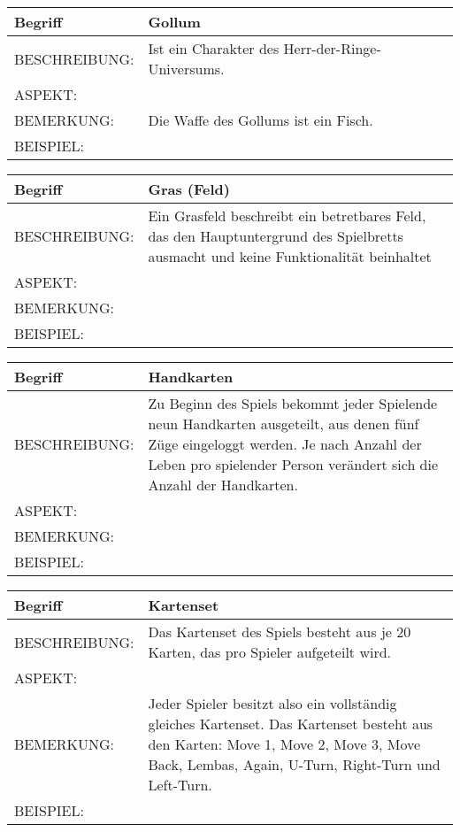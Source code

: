 \documentclass{uulm-assignment}
\begin{document}
	     \begin{tabularx}{\textwidth}{|l|X |} \hline
	        \textbf{Begriff} & \textbf{Gollum } \\
	        \hline
	        BESCHREIBUNG: & Ist ein Charakter des Herr-der-Ringe-Universums. \\
	        \hline
	        ASPEKT: &
	        \\
	        \hline
	        BEMERKUNG: & Die Waffe des Gollums ist ein Fisch.\\
	        \hline
	        BEISPIEL: & \\
	        \hline
	    \end{tabularx}

	     \begin{tabularx}{\textwidth}{|l|X |} \hline
	        \textbf{Begriff} & \textbf{Gras (Feld)} \\
	        \hline
	        BESCHREIBUNG: & Ein Grasfeld beschreibt ein betretbares Feld, das den Hauptuntergrund des Spielbretts ausmacht und keine Funktionalität beinhaltet \\
	        \hline
	        ASPEKT: &
	        \\
	        \hline
	        BEMERKUNG: & \\
	        \hline
	        BEISPIEL: & \\
	        \hline
	    \end{tabularx}

	     \begin{tabularx}{\textwidth}{|l|X |} \hline
	        \textbf{Begriff} & \textbf{Handkarten} \\
	        \hline
	        BESCHREIBUNG: & Zu Beginn des Spiels bekommt jeder Spielende neun Handkarten ausgeteilt, aus denen fünf Züge eingeloggt werden. Je nach Anzahl der Leben pro spielender Person verändert sich die Anzahl der Handkarten. \\
	        \hline
	        ASPEKT: &
	        \\
	        \hline
	        BEMERKUNG: & \\
	        \hline
	        BEISPIEL: & \\
	        \hline
	    \end{tabularx}

	     \begin{tabularx}{\textwidth}{|l|X |} \hline
	        \textbf{Begriff} & \textbf{Kartenset} \\
	        \hline
	        BESCHREIBUNG: & Das Kartenset des Spiels besteht aus je 20 Karten, das pro Spieler aufgeteilt wird.  \\
	        \hline
	        ASPEKT: &
	        \\
	        \hline
	        BEMERKUNG: & Jeder Spieler besitzt also ein vollständig gleiches Kartenset. Das Kartenset besteht aus den Karten: Move 1, Move 2, Move 3, Move Back, Lembas, Again, U-Turn, Right-Turn und Left-Turn.\\
	        \hline
	        BEISPIEL: & \\
	        \hline
	    \end{tabularx}
\end{document}
